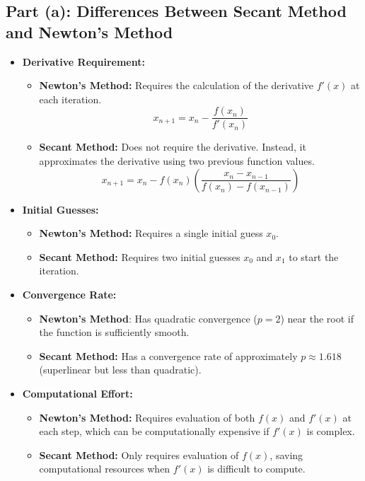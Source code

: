 \documentclass[12pt]{article}
\begin{document}
\subsection*{Part (a): Differences Between Secant Method and Newton’s Method}

\begin{itemize}
    \item \textbf{Derivative Requirement:}
    \begin{itemize}
        \item \textbf{Newton’s Method:} Requires the calculation of the derivative \( f'(x) \) at each iteration.
        \[
        x_{n+1} = x_n - \frac{f(x_n)}{f'(x_n)}
        \]
        \item \textbf{Secant Method:} Does not require the derivative. Instead, it approximates the derivative using two previous function values.
        \[
        x_{n+1} = x_n - f(x_n) \left( \frac{x_n - x_{n-1}}{f(x_n) - f(x_{n-1})} \right)
        \]
    \end{itemize}
    
    \item \textbf{Initial Guesses:}
    \begin{itemize}
        \item \textbf{Newton’s Method:} Requires a single initial guess \( x_0 \).
        \item \textbf{Secant Method:} Requires two initial guesses \( x_0 \) and \( x_1 \) to start the iteration.
    \end{itemize}

    \item \textbf{Convergence Rate:}
    \begin{itemize}
        \item \textbf{Newton’s Method}: Has quadratic convergence (\( p = 2 \)) near the root if the function is sufficiently smooth.
        \item \textbf{Secant Method:} Has a convergence rate of approximately \( p \approx 1.618 \) (superlinear but less than quadratic).
    \end{itemize}

    \item \textbf{Computational Effort:}
    \begin{itemize}
        \item \textbf{Newton’s Method:} Requires evaluation of both \( f(x) \) and \( f'(x) \) at each step, which can be computationally expensive if \( f'(x) \) is complex.
        \item \textbf{Secant Method:} Only requires evaluation of \( f(x) \), saving computational resources when \( f'(x) \) is difficult to compute.
    \end{itemize}
\end{itemize}
\end{document}
